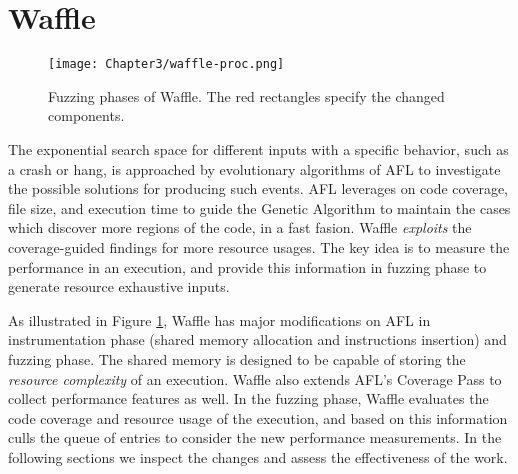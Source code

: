 \section{Waffle}
\label{sec:3-instr}




\begin{figure}[!t]
  \texttt{[image: Chapter3/waffle-proc.png]}
  \centering
  \caption{Fuzzing phases of Waffle. The red rectangles specify the changed components.}
  \label{fig:waffle-phases}
\end{figure}

The exponential search space for different inputs with a specific behavior, such as a crash or hang, is approached by evolutionary algorithms of AFL to investigate the possible solutions for producing such events. AFL leverages on code coverage, file size, and execution time to guide the Genetic Algorithm to maintain the cases which discover more regions of the code, in a fast fasion. Waffle \textit{exploits} the coverage-guided findings for more resource usages. The key idea is to measure the performance in an execution, and provide this information in fuzzing phase to generate resource exhaustive inputs. 


As illustrated in Figure \ref{fig:waffle-phases}, Waffle has major modifications on AFL in instrumentation phase (shared memory allocation and instructions insertion) and fuzzing phase. The shared memory is designed to be capable of storing the \textit{resource complexity} of an execution. Waffle also extends AFL's Coverage Pass to collect performance features as well. In the fuzzing phase, Waffle evaluates the code coverage and resource usage of the execution, and based on this information culls the queue of entries to consider the new performance measurements. In the following sections we inspect the changes and assess the effectiveness of the work.

